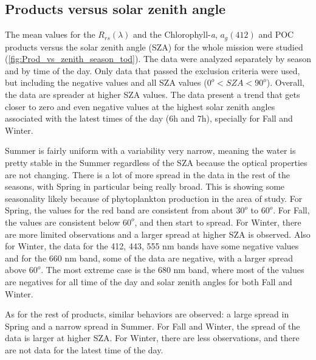 \documentclass[onecolumn,3p,letterpaper,11pt]{elsarticle}
\begin{document}
\subsection{Products versus solar zenith angle}
The mean values for the $R_{rs}(\lambda)$ and the Chlorophyll-{\it a},  $a_g(412)$ and POC products versus the solar zenith angle (SZA) for the whole mission were studied (\autoref{fig:Prod_vs_zenith_season_tod}). 
The data were analyzed separately by season and by time of the day. 
Only data that passed the exclusion criteria were used, but including the negative values and all SZA values ($0^o<SZA<90^o$).
Overall, the data are spreader at higher SZA values.
The data present a trend that gets closer to zero and even negative values at the highest solar zenith angles associated with the latest times of the day (6h and 7h), specially for Fall and Winter. 

Summer is fairly uniform with a variability very narrow, meaning the water is pretty stable in the Summer regardless of the SZA because the optical properties are not changing. There is a lot of more spread in the data in the rest of the seasons, with Spring in particular being really broad. This is showing some seasonality likely because of phytoplankton production in the area of study. 
For Spring, the values for the red band are consistent from about $30^o$ to $60^o$.
For Fall, the values are consistent below $60^o$, and then start to spread.
For Winter, there are more limited observations and a larger spread at higher SZA is observed. 
Also for Winter, the data for the 412, 443, 555 nm bands have some negative values and for the 660 nm band, some of the data are negative, with a larger spread above $60^o$. 
The most extreme case is the 680 nm band, where most of the values are negatives for all time of the day and solar zenith angles for both Fall and Winter. 

As for the rest of products, similar behaviors are observed: a large spread in Spring and a narrow spread in Summer. For Fall and Winter, the spread of the data is larger at higher SZA. For Winter, there are less observations, and there are not data for the latest time of the day. 
\end{document}

